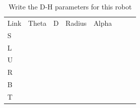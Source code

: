 \documentclass{article}
\begin{document}

\begin{table}
	\caption{Write the D-H parameters for this robot}
	\begin{tabular}[t]{lccccccc}
		Link & Theta & D 	  & Radius & Alpha \\ 
		S 	 & 	     &        &        &       \\	
		L 	 & 	     &        &        &       \\	
		U 	 & 	     &        &        &       \\	
		R 	 & 	     &        &        &       \\	
		B 	 & 	     &        &        &       \\	
		T 	 & 	     &        &        &       \\	
	\end{tabular}
\end{table}
\newpage
\end{document}
